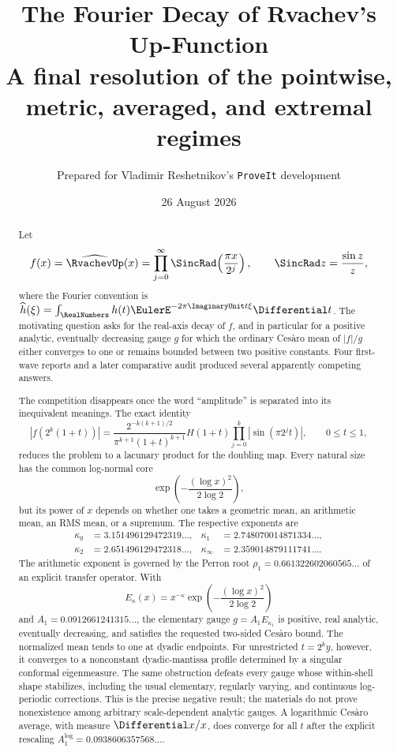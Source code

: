 \documentclass[11pt,oneside]{article}
\title{\bfseries The Fourier Decay of Rvachev's Up-Function\\[0.35em]
\large A final resolution of the pointwise, metric, averaged, and extremal regimes}
\author{Prepared for Vladimir Reshetnikov's \texttt{ProveIt} development}
\date{26 August 2026}
\theoremstyle{definition}
\theoremstyle{remark}
\begin{document}
\maketitle

\begin{abstract}
Let
\[
 f(x)=\widehat{\RvachevUp}(x)
 =\prod_{j=0}^{\infty}\SincRad\!\left(\frac{\pi x}{2^j}\right),
 \qquad \SincRad z=\frac{\sin z}{z},
\]
where the Fourier convention is
$\widehat h(\xi)=\int_{\RealNumbers}h(t)\EulerE^{-2\pi\ImaginaryUnit t\xi}\Differential t$.
The motivating question asks for the real-axis decay of $f$, and in particular
for a positive analytic, eventually decreasing gauge $g$ for which the
ordinary Ces\`aro mean of $|f|/g$ either converges to one or remains bounded
between two positive constants.  Four first-wave reports and a later
comparative audit produced several apparently competing answers.

The competition disappears once the word ``amplitude'' is separated into its
inequivalent meanings.  The exact identity
\[
 |f(2^k(1+t))|
 =\frac{2^{-k(k+1)/2}}{\pi^{k+1}(1+t)^{k+1}}
 H(1+t)\prod_{j=0}^{k}|\sin(\pi2^jt)|,
 \qquad 0\le t\le1,
\]
reduces the problem to a lacunary product for the doubling map.  Every natural
size has the common log-normal core
\[
 \exp\!\left(-\frac{(\log x)^2}{2\log2}\right),
\]
but its power of $x$ depends on whether one takes a geometric mean, an
arithmetic mean, an RMS mean, or a supremum.  The respective exponents are
\[
\begin{aligned}
 \kappa_0&=3.151496129472319\ldots,
 &\kappa_1&=2.748070014871334\ldots,\\
 \kappa_2&=2.651496129472318\ldots,
 &\kappa_\infty&=2.359014879111741\ldots .
\end{aligned}
\]
The arithmetic exponent is governed by the Perron root
$\rho_1=0.661322602060565\ldots$ of an explicit transfer operator.  With
\[
 E_\kappa(x)=x^{-\kappa}
 \exp\!\left(-\frac{(\log x)^2}{2\log2}\right)
\]
and
$A_1=0.0912661241315\ldots$, the elementary gauge
$g=A_1E_{\kappa_1}$ is positive, real analytic, eventually decreasing, and
satisfies the requested two-sided Ces\`aro bound.  The normalized mean tends
to one at dyadic endpoints.  For unrestricted $t=2^ky$, however, it converges
to a nonconstant dyadic-mantissa profile determined by a singular conformal
eigenmeasure.  The same obstruction defeats every gauge whose within-shell
shape stabilizes, including the usual elementary, regularly varying, and
continuous log-periodic corrections.  This is the precise negative result;
the materials do not prove nonexistence among arbitrary scale-dependent
analytic gauges.  A logarithmic Ces\`aro average, with measure $\Differential x/x$, does
converge for all $t$ after the explicit rescaling
$A_1^{\log}=0.0938606357568\ldots$.


\end{abstract}
\end{document}
